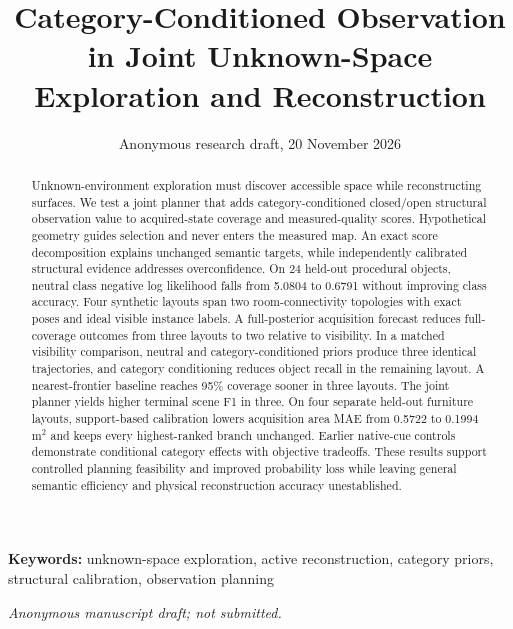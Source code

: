 \documentclass[11pt,a4paper]{article}
\begin{document}
\title{Category-Conditioned Observation in Joint Unknown-Space Exploration and Reconstruction}
\author{}
\date{Anonymous research draft, 20 November 2026}
\maketitle
\begin{abstract}
Unknown-environment exploration must discover accessible space while reconstructing surfaces. We test a joint planner that adds category-conditioned closed/open structural observation value to acquired-state coverage and measured-quality scores. Hypothetical geometry guides selection and never enters the measured map. An exact score decomposition explains unchanged semantic targets, while independently calibrated structural evidence addresses overconfidence. On 24 held-out procedural objects, neutral class negative log likelihood falls from 5.0804 to 0.6791 without improving class accuracy. Four synthetic layouts span two room-connectivity topologies with exact poses and ideal visible instance labels. A full-posterior acquisition forecast reduces full-coverage outcomes from three layouts to two relative to visibility. In a matched visibility comparison, neutral and category-conditioned priors produce three identical trajectories, and category conditioning reduces object recall in the remaining layout. A nearest-frontier baseline reaches 95\% coverage sooner in three layouts. The joint planner yields higher terminal scene F1 in three. On four separate held-out furniture layouts, support-based calibration lowers acquisition area MAE from 0.5722 to 0.1994\,m$^2$ and keeps every highest-ranked branch unchanged. Earlier native-cue controls demonstrate conditional category effects with objective tradeoffs. These results support controlled planning feasibility and improved probability loss while leaving general semantic efficiency and physical reconstruction accuracy unestablished.
\end{abstract}
\noindent\textbf{Keywords:} unknown-space exploration, active reconstruction, category priors, structural calibration, observation planning

\noindent\textit{Anonymous manuscript draft; not submitted.}






\end{document}
